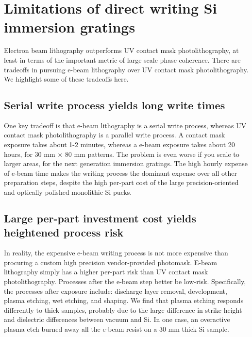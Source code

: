 \documentclass[]{spie}  %
\begin{document}
\section{Limitations of direct writing Si immersion gratings}
Electron beam lithography outperforms UV contact mask photolithography, at least in terms of the important metric of large scale phase coherence.  There are tradeoffs in pursuing e-beam lithography over UV contact mask photolithography.  We highlight some of these tradeoffs here.

\subsection{Serial write process yields long write times}
One key tradeoff is that e-beam lithography is a serial write process, whereas UV contact mask photolithography is a parallel write process.  A contact mask exposure takes about 1-2 minutes, whereas a e-beam exposure takes about 20 hours, for 30 mm $\times$ 80 mm patterns.  The problem is even worse if you scale to larger areas, for the next generation immersion gratings.  The high hourly expense of e-beam time makes the writing process the dominant expense over all other preparation steps, despite the high per-part cost of the large precision-oriented and optically polished monolithic Si pucks.  

\subsection{Large per-part investment cost yields heightened process risk}
In reality, the expensive e-beam writing process is not more expensive than procuring a custom high precision vendor-provided photomask.  E-beam lithography simply has a higher per-part risk than UV contact mask photolithography.  Processes after the e-beam step better be low-risk.  Specifically, the processes after exposure include: discharge layer removal, development, plasma etching, wet etching, and shaping.  We find that plasma etching responds differently to thick samples, probably due to the large difference in strike height and dielectric differences between vacuum and Si.  In one case, an overactive plasma etch burned away all the e-beam resist on a 30 mm thick Si sample.
\end{document}
